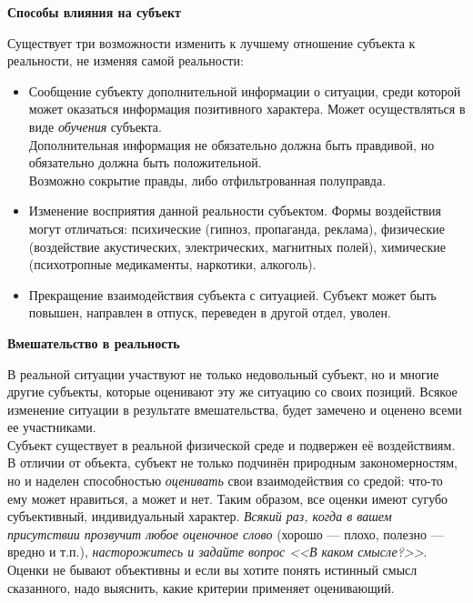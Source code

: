 \documentclass{article}
\newcommand{\note}[1]{\textit{#1}}
\renewcommand{\subsection}[1]{
	\vspace{2em}
	\begin{flushright}
		\large
		\textbf{#1}
	\end{flushright}
	}
\begin{document}
\subsection{Способы влияния на субъект}
Существует три возможности изменить к лучшему отношение субъекта к реальности, не изменяя самой реальности:
\begin{itemize}
	\item Сообщение субъекту дополнительной информации о ситуации, среди которой может оказаться информация позитивного характера. Может осуществляться в виде \note{обучения} субъекта.\\Дополнительная информация не обязательно должна быть правдивой, но обязательно должна быть положительной.\\Возможно сокрытие правды, либо отфильтрованная полуправда.
	\item Изменение восприятия данной реальности субъектом. Формы воздействия могут отличаться: психические (гипноз, пропаганда, реклама), физические (воздействие акустических, электрических, магнитных полей), химические (психотропные медикаменты, наркотики, алкоголь).
	\item Прекращение взаимодействия субъекта с ситуацией. Субъект может быть повышен, направлен в отпуск, переведен в другой отдел, уволен.
\end{itemize}
\subsection{Вмешательство в реальность}
В реальной ситуации участвуют не только недовольный субъект, но и многие другие субъекты, которые оценивают эту же ситуацию со своих позиций. Всякое изменение ситуации в результате вмешательства, будет замечено и оценено всеми ее участниками.\\
Субъект существует в реальной физической среде и подвержен её воздействиям. В отличии от объекта, субъект не только подчинён природным закономерностям, но и наделен способностью \note{оценивать} свои взаимодействия со средой: что-то ему может нравиться, а может и нет. Таким образом, все оценки имеют сугубо субъективный, индивидуальный характер.
\note{Всякий раз, когда в вашем присутствии прозвучит любое оценочное слово} (хорошо --- плохо, полезно --- вредно и т.п.), \note{насторожитесь и задайте вопрос <<В каком смысле?>>}. Оценки не бывают объективны и если вы хотите понять истинный смысл сказанного, надо выяснить, какие критерии применяет оценивающий.
\end{document}
